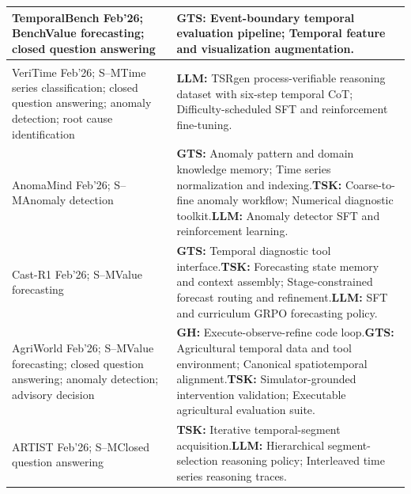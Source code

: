 \documentclass[preprints,article,submit,moreauthors]{Definitions/mdpi}
\newcommand{\typeSMshort}{\textsf{S--M}}
\newcommand{\typeBenchshort}{\textsf{Bench}}
\newcommand{\selfclaim}{\textsuperscript{\dag}}
\begin{document}
\begin{longtable}{@{}>{\raggedright\arraybackslash}p{}p{}@{}}
TemporalBench \citep{temporalbench2026} Feb'26; \typeBenchshort{}\newline Value forecasting; closed question answering & \textbf{GTS:} Event-boundary temporal evaluation pipeline; Temporal feature and visualization augmentation.\\\midrule
VeriTime \citep{veritime2026}\selfclaim{} Feb'26; \typeSMshort{}\newline Time series classification; closed question answering; anomaly detection; root cause identification & \textbf{LLM:} TSRgen process-verifiable reasoning dataset with six-step temporal CoT; Difficulty-scheduled SFT and reinforcement fine-tuning.\\\midrule
AnomaMind \citep{anomamind2026} Feb'26; \typeSMshort{}\newline Anomaly detection & \textbf{GTS:} Anomaly pattern and domain knowledge memory; Time series normalization and indexing.\newline\textbf{TSK:} Coarse-to-fine anomaly workflow; Numerical diagnostic toolkit.\newline\textbf{LLM:} Anomaly detector SFT and reinforcement learning.\\\midrule
Cast-R1 \citep{castr12026} Feb'26; \typeSMshort{}\newline Value forecasting & \textbf{GTS:} Temporal diagnostic tool interface.\newline\textbf{TSK:} Forecasting state memory and context assembly; Stage-constrained forecast routing and refinement.\newline\textbf{LLM:} SFT and curriculum GRPO forecasting policy.\\\midrule
AgriWorld \citep{agriworld2026} Feb'26; \typeSMshort{}\newline Value forecasting; closed question answering; anomaly detection; advisory decision & \textbf{GH:} Execute-observe-refine code loop.\newline\textbf{GTS:} Agricultural temporal data and tool environment; Canonical spatiotemporal alignment.\newline\textbf{TSK:} Simulator-grounded intervention validation; Executable agricultural evaluation suite.\\\midrule
ARTIST \citep{artist2026}\selfclaim{} Feb'26; \typeSMshort{}\newline Closed question answering & \textbf{TSK:} Iterative temporal-segment acquisition.\newline\textbf{LLM:} Hierarchical segment-selection reasoning policy; Interleaved time series reasoning traces.\\\midrule

\end{longtable}
\end{document}
